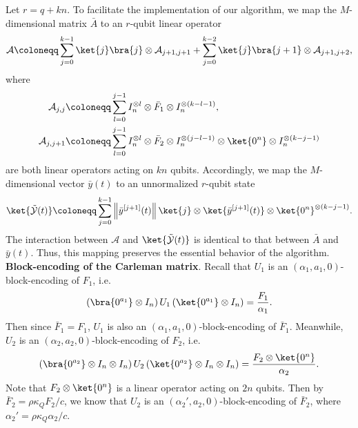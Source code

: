 \documentclass[superscriptaddress,onecolumn,nofootinbib,longbibliography,a4paper,accepted=2026-09-29]{quantumarticle}
\theoremstyle{plain}
\theoremstyle{definition}
\numberwithin{thm}{section}
\numberwithin{assumption}{section}
\numberwithin{lemma}{section}
\numberwithin{prop}{section}
\numberwithin{cor}{section}
\numberwithin{definition}{section}
\numberwithin{rmk}{section}
\numberwithin{equation}{section}
\newcommand{\norm}[1]     {\left\| #1 \right\|}
\newcommand{\lrb}[1]{\left ( #1 \right )}
\newcommand{\defeq}{\coloneqq}
\begin{document}
Let $r=q+kn$. To facilitate the implementation of our algorithm, we map the $M$-dimensional matrix
$\bar{A}$ to an $r$-qubit linear operator
\begin{align}
    \mathcal{A} \defeq \sum_{j=0}^{k-1} \ket{j}\bra{j} \otimes \mathcal{A}_{j+1,j+1} +
    \sum_{j=0}^{k-2} \ket{j}\bra{j+1} \otimes \mathcal{A}_{j+1,j+2},
\end{align}
where
\begin{align}
\mathcal{A}_{j,j} &\defeq \sum_{l=0}^{j-1} I_n^{\otimes l} \otimes \bar{F}_1 \otimes I_n^{\otimes (k-l-1)},
\label{eq:carleman_linearization_def_ajj_cal}\\ 
\mathcal{A}_{j,j+1}&\defeq \sum_{l=0}^{j-1} I_n^{\otimes l} \otimes \bar{F}_2 \otimes I_n^{\otimes (j-l-1)} \otimes \ket{0^n} \otimes I_n^{\otimes (k-j-1)}
\end{align}
are both linear operators acting on $kn$ qubits. Accordingly, we map the $M$-dimensional vector $\bar{y}(t)$ to an unnormalized $r$-qubit state 
\begin{align}
    \ket{\tilde{\mathcal{Y}}(t)} \defeq \sum_{j=0}^{k-1} \norm{\bar{y}^{[j+1]}(t)}\ket{j} \otimes \ket{\bar{y}^{[j+1]}(t)} \otimes \ket{0^n}^{\otimes (k-j-1)}.
\end{align}
The interaction between $\mathcal{A}$ and $\ket{\tilde{\mathcal{Y}}(t)}$ is identical to that between $\bar{A}$ and $\bar{y}(t)$. Thus, this mapping preserves the essential behavior of the algorithm. \\

\noindent\textbf{Block-encoding of the Carleman matrix}. Recall that $U_1$ is an $(\alpha_1, a_1, 0)$-block-encoding of $F_1$, i.e.
\begin{align}
\lrb{\bra{0^{a_1}} \otimes I_n}
U_1
\lrb{\ket{0^{a_1}} \otimes I_n}
=\frac{F_1}{\alpha_1}.
\end{align}
Then since $\bar{F}_1=F_1$, $U_1$ is also an $(\alpha_1, a_1, 0)$-block-encoding of $\bar{F}_1$. Meanwhile, 
$U_2$ is an $(\alpha_2, a_2, 0)$-block-encoding of $F_2$, i.e.
\begin{align}
\lrb{\bra{0^{a_2}} \otimes I_n \otimes I_n}
U_2
\lrb{\ket{0^{a_2}} \otimes I_n \otimes I_n}
=\frac{F_2 \otimes \ket{0^n}}{\alpha_2}.
\end{align}  
Note that $F_2 \otimes \ket{0^n}$ is a linear operator acting on $2n$ qubits. Then by $\bar{F}_2=\rho \kappa_Q F_2 / c$, we know that $U_2$ is an $(\alpha_2', a_2, 0)$-block-encoding of $\bar{F}_2$,
where 
$\alpha_2'=\rho\kappa_Q\alpha_2/c$.
\end{document}
